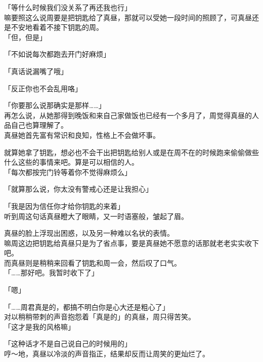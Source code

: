「等什么时候我们没关系了再还我也行」\\

嘛要照这么说周要是把钥匙给了真昼，那就可以受她一段时间的照顾了，可真昼还是不安地看着不接下钥匙的周。\\

「但，但是」

「不如说每次都跑去开门好麻烦」

「真话说漏嘴了哦」

「反正你也不会乱用咯」

「你要那么说那确实是那样……」\\

再怎么说，从她那得到晚饭和来自己家做饭也已经有一个多月了，周觉得真昼的人品自己也算理解了。\\

真昼她首先富有常识和良知，性格上不会做坏事。

就算她拿了钥匙，想必也不会干出把钥匙给别人或是在周不在的时候跑来偷偷做些什么这些的事情来吧。算是可以相信的人。\\

「每次都按完门铃等着你不觉得麻烦么」

「就算那么说，你太没有警戒心还是让我担心」

「我是因为信任你才给你钥匙的来着」\\

听到周这句话真昼瞪大了眼睛，又一时语塞般，皱起了眉。

真昼的脸上浮现出困惑，以及另一种难以名状的表情。\\

嘛周这边把钥匙给真昼只是为了省点事，要是真昼她不愿意的话那就老老实实收下吧。\\

而真昼则是稍稍来回看了钥匙和周一会，然后叹了口气。\\

「……那好吧。我暂时收下了」

「嗯」

「……周君真是的，都搞不明白你是心大还是粗心了」\\

对以稍稍带刺的声音抱怨着「真是的」的真昼，周只得苦笑。\\

「这才是我的风格嘛」

「这种话才不是自己说自己的时候用的」\\

哼～地，真昼以冷淡的声音指正，结果却反而让周笑的更灿烂了。\\

